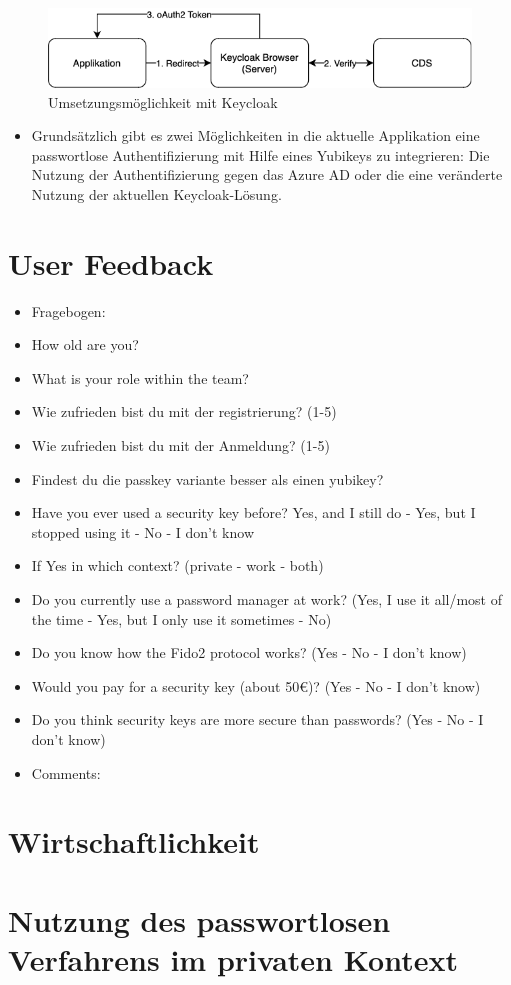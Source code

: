 \begin{figure}[h]
	\centering 
	\includegraphics[width=1\textwidth]{img/abbildungen/keycloak_browser.png}
	\captionsetup{format=hang}
	\caption{Umsetzungsmöglichkeit mit Keycloak}
\end{figure}

\begin{itemize}
    \item Grundsätzlich gibt es zwei Möglichkeiten in die aktuelle Applikation eine passwortlose Authentifizierung mit Hilfe eines Yubikeys zu integrieren: Die Nutzung der Authentifizierung gegen das Azure \ac{AD} oder die eine veränderte Nutzung der aktuellen Keycloak-Lösung.
\end{itemize}

\section{User Feedback}
\begin{itemize}
    \item Fragebogen:
    \item How old are you?
    \item What is your role within the team?
    \item Wie zufrieden bist du mit der registrierung? (1-5)
    \item Wie zufrieden bist du mit der Anmeldung? (1-5)
    \item Findest du die passkey variante besser als einen yubikey?
    \item Have you ever used a security key before? Yes, and I still do - Yes, but I stopped using it - No - I don't know
    \item If Yes in which context? (private - work - both)
    \item Do you currently use a password manager at work? (Yes, I use it all/most of the time - Yes, but I only use it sometimes - No)
    \item Do you know how the Fido2 protocol works? (Yes - No - I don't know)
    \item Would you pay for a security key (about 50€)? (Yes - No - I don't know)
    \item Do you think security keys are more secure than passwords? (Yes - No - I don't know)
    \item Comments:
\end{itemize}

\section{Wirtschaftlichkeit}

\section{Nutzung des passwortlosen Verfahrens im privaten Kontext}